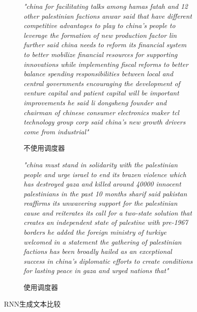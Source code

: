     \begin{figure}[H]
        \centering
        \begin{subfigure}[b]{0.45\textwidth}
            \textit{"china for facilitating talks among hamas fatah and 12 other palestinian factions anwar said that have different competitive advantages to play to china's people to leverage the formation of new production factor lin further said china needs to reform its financial system to better mobilize financial resources for supporting innovations while implementing fiscal reforms to better balance spending responsibilities between local and central governments encouraging the development of venture capital and patient capital will be important improvements he said li dongsheng founder and chairman of chinese consumer electronics maker tcl technology group corp said china's new growth drivers come from industrial"}
            \caption{不使用调度器}
            \label{fig:rnntextnoscheduler}
        \end{subfigure}
        \hfill
        \begin{subfigure}[b]{0.45\textwidth}
            \textit{"china must stand in solidarity with the palestinian people and urge israel to end its brazen violence which has destroyed gaza and killed around 40000 innocent palestinians in the past 10 months sharif said pakistan reaffirms its unwavering support for the palestinian cause and reiterates its call for a two-state solution that creates an independent state of palestine with pre-1967 borders he added the foreign ministry of turkiye welcomed in a statement the gathering of palestinian factions has been broadly hailed as an exceptional success in china's diplomatic efforts to create conditions for lasting peace in gaza and urged nations that"}
            \caption{使用调度器}
            \label{fig:rnntextwithscheduler}
        \end{subfigure}
        \caption{RNN生成文本比较}
        \label{fig:rnntext-comparison}
    \end{figure}